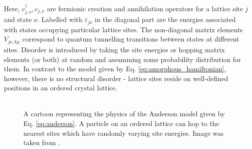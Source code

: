 \documentclass[10pt,a4paper]{article}
\begin{document}
\begin{minipage}[t]{0.5\textwidth} 
Here, $c^\dagger_{j,\nu}, c_{j,\nu}$ are fermionic creation and annihilation operators for a lattice site $j$ and state $\nu$. Labelled with $\varepsilon_{j\nu}$ in the diagonal part are the energies associated with states occupying particular lattice sites. The non-diagonal matrix elements $V_{j\nu, k\mu}$ correspond to quantum tunnelling transitions between states at different sites. Disorder is introduced by taking the site energies or hopping matrix elements (or both) at random and assumming some probability distribution for them. In contrast to the model given by Eq. \eqref{eq:amorphous_hamiltonian}, however, there is no structural disorder - lattice sites reside on well-defined positions in an ordered crystal lattice. \\\\
\noindent  
\end{minipage}\hfill
\begin{minipage}[t]{0.45\textwidth}
\begin{figure}[H]
\caption{A cartoon representing the physics of the Anderson model given by Eq. \eqref{eq:anderson}. A particle on an ordered lattice can hop to the nearest sites which have randomly varying site energies. Image was taken from \cite{50yearsof}.}
\label{fig:anderson_hopping} 
\end{figure}
\end{minipage}
\end{document}
